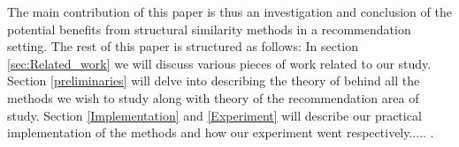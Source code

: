   The main contribution of this paper is thus an investigation and conclusion of the potential benefits from structural similarity methods in a recommendation setting. The rest of this paper is structured as follows:
  In section \ref{sec:Related_work} we will discuss various pieces of work related to our study. Section \ref{preliminaries} will delve into describing the theory of behind all the methods we wish to study along with theory of the recommendation area of study. Section \ref{Implementation} and \ref{Experiment} will describe our practical implementation of the methods and how our experiment went respectively..... .
